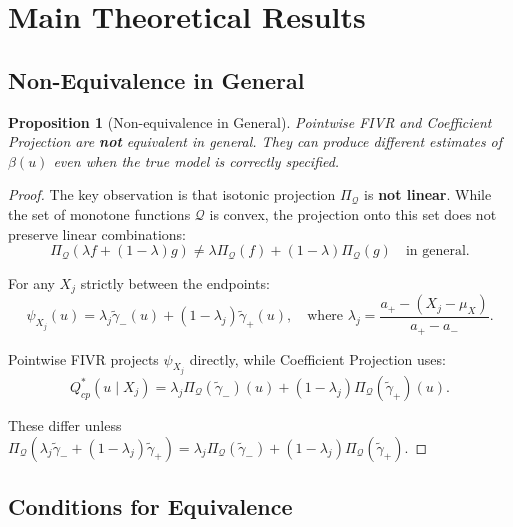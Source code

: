 \documentclass[12pt]{article}
\newcommand{\calQ}{\mathcal{Q}}
\newcommand{\PiQ}{\Pi_{\mathcal{Q}}}
\newtheorem{proposition}{Proposition}
\begin{document}
\section{Main Theoretical Results}

\subsection{Non-Equivalence in General}

\begin{proposition}[Non-equivalence in General]\label{prop:nonequiv}
Pointwise FIVR and Coefficient Projection are \textbf{not} equivalent in general. They can produce different estimates of $\beta(u)$ even when the true model is correctly specified.
\end{proposition}

\begin{proof}
The key observation is that isotonic projection $\PiQ$ is \textbf{not linear}. While the set of monotone functions $\calQ$ is convex, the projection onto this set does not preserve linear combinations:
\[
\PiQ(\lambda f + (1-\lambda) g) \neq \lambda \PiQ(f) + (1-\lambda) \PiQ(g) \quad \text{in general}.
\]

For any $X_j$ strictly between the endpoints:
\[
\psi_{X_j}(u) = \lambda_j \tilde{\gamma}_-(u) + (1-\lambda_j) \tilde{\gamma}_+(u), \quad \text{where } \lambda_j = \frac{a_+ - (X_j - \mu_X)}{a_+ - a_-}.
\]

Pointwise FIVR projects $\psi_{X_j}$ directly, while Coefficient Projection uses:
\[
Q^*_{cp}(u \mid X_j) = \lambda_j \PiQ(\tilde{\gamma}_-)(u) + (1-\lambda_j) \PiQ(\tilde{\gamma}_+)(u).
\]

These differ unless $\PiQ(\lambda_j \tilde{\gamma}_- + (1-\lambda_j) \tilde{\gamma}_+) = \lambda_j \PiQ(\tilde{\gamma}_-) + (1-\lambda_j) \PiQ(\tilde{\gamma}_+)$.
\end{proof}

\subsection{Conditions for Equivalence}
\end{document}
